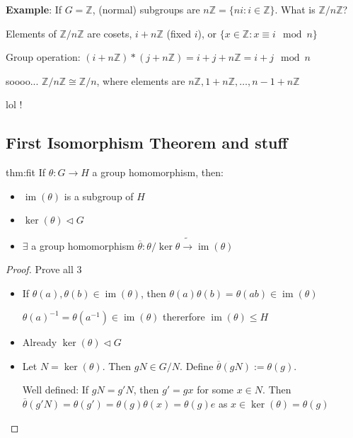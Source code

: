 \documentclass{article}
\DeclareMathOperator{\Ima}{im}
\begin{document}
\textbf{Example}: If $G = \mathbb{Z}$, (normal) subgroups are $n\mathbb{Z} = \{ni : i \in \mathbb{Z}\}$. What is $\mathbb{Z} /n \mathbb{Z}$?

Elements of $\mathbb{Z} / n\mathbb{Z}$ are cosets, $i + n\mathbb{Z}$ (fixed $i$), or $\{x\in \mathbb{Z} : x \equiv i \mod n\}$

Group operation: $(i + n\mathbb{Z}) * (j + n\mathbb{Z}) = i + j + n\mathbb{Z} = i + j \mod n$

soooo... $\mathbb{Z} /n\mathbb{Z} \cong \mathbb{Z} /n$, where elements are $n\mathbb{Z}, 1 + n\mathbb{Z},\dots,n-1 + n\mathbb{Z}$

lol !

\newpage
\subsection{First Isomorphism Theorem and stuff}
\begin{thm}{thm:fit}{}
    If $\theta : G \to H$ a group homomorphism, then:
    \begin{itemize}
        \item $\Ima(\theta)$ is a subgroup of $H$
        \item $\ker(\theta) \triangleleft G$
        \item $\exists$ a group homomorphism $\overline{\theta} : \theta / \ker \theta \tilde{\to} \Ima(\theta)$
    \end{itemize}
\end{thm}

\begin{proof}
    Prove all 3

    \begin{itemize}
        \item If $\theta(a),\theta(b)\in \Ima(\theta)$, then $\theta(a)\theta(b) = \theta(ab)\in \Ima(\theta)$

            $\theta(a)^{-1} = \theta(a^{-1})\in \Ima(\theta)$ thererfore $\Ima (\theta) \le H$
        \item Already $\ker(\theta) \triangleleft G$
        \item Let $N = \ker(\theta)$. Then $gN \in G /N$. Define $\overline{\theta}(gN) := \theta(g)$.

            Well defined: If $gN = g'N$, then $g' = gx$ for some $x\in N$. Then $\overline{\theta}(g'N) = \theta(g') = \theta(g)\theta(x) = \theta(g)e$ as $x\in \ker(\theta) = \theta(g)$
    \end{itemize}
\end{proof}
\end{document}
